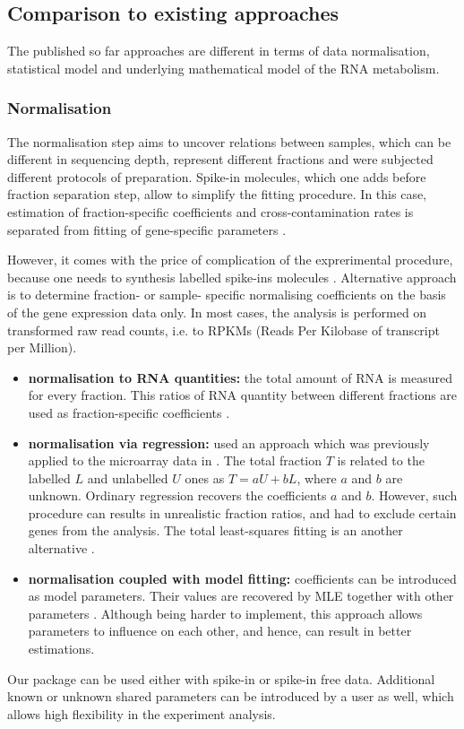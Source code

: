 \subsection{Comparison to existing approaches}
The published so far approaches are different in terms of 
data normalisation, statistical model and underlying mathematical model of the 
RNA metabolism.
\subsubsection*{Normalisation}
The normalisation step aims to uncover relations between samples, which can 
be different in sequencing depth, represent different fractions and were subjected
different protocols of preparation. 
Spike-in molecules, which one adds before fraction separation step,
allow to simplify the fitting procedure. In this case, estimation of fraction-specific 
coefficients and cross-contamination rates is separated from fitting of gene-specific parameters
\citep{schwalb2016tt,neymotin2014determination}.
\par 
However, it comes with the price of complication of the exprerimental procedure,
because one needs to synthesis labelled spike-ins molecules \citep{}.
Alternative approach is to determine fraction- or sample- specific 
normalising coefficients on the basis of the gene expression data only.
 In most cases, the analysis is performed on transformed raw read counts, i.e.
 to RPKMs (Reads Per Kilobase of transcript per Million).
\begin{itemize}
 \item 
\textbf{normalisation to RNA quantities:}  the total amount of 
RNA  is measured for every fraction. This ratios of RNA quantity between 
different fractions are used as fraction-specific coefficients \citep{rabani2011metabolic}.
\item 
\textbf{normalisation via regression:} \citet{schwanhausser2011global} 
used an approach which was previously applied to 
 the microarray data in \citep{dolken2008high}.
 The total fraction $T$ is related to the labelled $L$ and unlabelled $U$ ones as
 $T = aU + bL$, where $a$ and $b$ are unknown.
 Ordinary regression recovers the coefficients $a$ and $b$. However,
 such procedure can results in unrealistic fraction ratios, and \citet{schwanhausser2011global}
 had to exclude certain genes from the analysis. 
 The total least-squares fitting is an another alternative \citep{miller2011dynamic, schwalb2012measurement}.
 \item \textbf{normalisation coupled with model fitting:}
 coefficients can be introduced as model parameters. Their values are
 recovered by MLE  together with other parameters \citep{eser2016determinants, de2015inspect}.
 Although being harder to implement, this approach allows parameters to influence 
 on each other, and hence, can result in  better estimations.
\end{itemize}
Our package can be used either with spike-in or spike-in free data.
Additional known or unknown shared parameters can be introduced by a user as well, 
which allows high flexibility in the experiment analysis.

